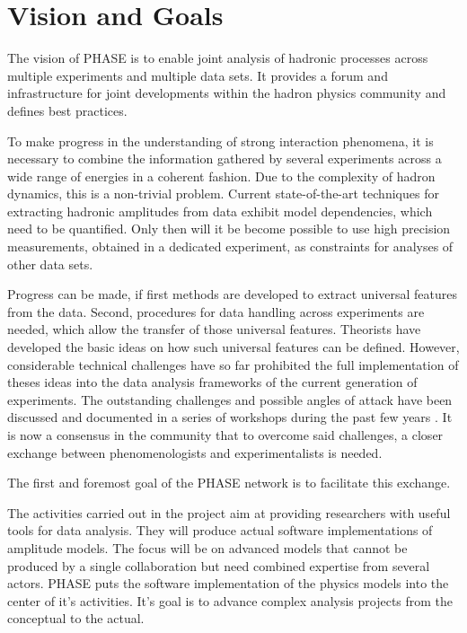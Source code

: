 \section{Vision and Goals}

The vision of PHASE is to enable joint analysis of hadronic processes across multiple experiments and multiple data sets. It provides a forum and infrastructure for joint developments within the hadron physics community and defines best practices.

To make progress in the understanding of strong interaction phenomena, it is necessary to combine the information gathered by several experiments across a wide range of energies in a coherent fashion. Due to the complexity of hadron dynamics, this is a non-trivial problem. Current state-of-the-art techniques for extracting hadronic amplitudes from data exhibit model dependencies, which need to be quantified. Only then will it be become possible to use high precision measurements, obtained in a dedicated experiment, as constraints for analyses of other data sets. 

Progress can be made, if first methods are developed to extract universal features from the data. Second, procedures for data handling across experiments are needed, which allow the transfer of those universal features. Theorists have developed the basic ideas on how such universal features can be defined. However, considerable technical challenges have so far prohibited the full implementation of theses ideas into the data analysis frameworks of the current generation of experiments. The outstanding challenges and possible angles of attack have been discussed and documented in a series of workshops during the past few years \cite{Battaglieri_2015, Brice_o_2016, Lutz_2016}. It is now a consensus in the community that to overcome said challenges, a closer exchange between phenomenologists and experimentalists is needed.

The first and foremost goal of the PHASE network is to facilitate this exchange. 

The activities carried out in the project aim at providing researchers with useful tools for data analysis. They will produce actual software implementations of amplitude models. The focus will be on advanced models that cannot be produced by a single collaboration but need combined expertise from several actors. PHASE puts the software implementation of the physics models into the center of it's activities. It's goal is to advance complex analysis projects from the conceptual to the actual.





